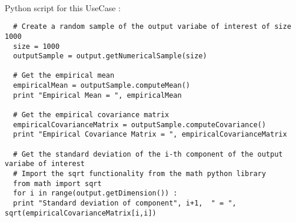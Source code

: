 \textspace\\
Python script for this UseCase :

\begin{lstlisting}
  # Create a random sample of the output variabe of interest of size 1000
  size = 1000
  outputSample = output.getNumericalSample(size)

  # Get the empirical mean
  empiricalMean = outputSample.computeMean()
  print "Empirical Mean = ", empiricalMean

  # Get the empirical covariance matrix
  empiricalCovarianceMatrix = outputSample.computeCovariance()
  print "Empirical Covariance Matrix = ", empiricalCovarianceMatrix

  # Get the standard deviation of the i-th component of the output variabe of interest
  # Import the sqrt functionality from the math python library
  from math import sqrt
  for i in range(output.getDimension()) :
  print "Standard deviation of component", i+1,  " = ", sqrt(empiricalCovarianceMatrix[i,i])
\end{lstlisting}

